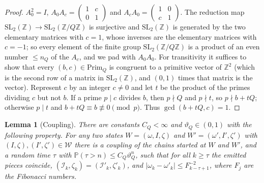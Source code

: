 \documentclass[11pt]{amsart}
\newtheorem{lemma}[theorem]{Lemma}
\theoremstyle{definition}
\numberwithin{equation}{section}
\newcommand{\Z}{\mathbb{Z}}
\newcommand{\Prob}{\mathbb{P}}
\newcommand{\cI}{\mathcal{I}}
\newcommand{\cW}{\mathcal{W}}
\newcommand{\Prim}{\mathrm{Prim}}
\begin{document}
\begin{proof}
$A_0^2=I$, $A_0A_c=\left(\begin{smallmatrix}1&c\\0&1\end{smallmatrix}\right)$ and $A_cA_0=\left(\begin{smallmatrix}1&0\\c&1\end{smallmatrix}\right)$. The reduction map
$\mathrm{SL}_2(\Z)\to\mathrm{SL}_2(\Z/Q\Z)$ is surjective and $\mathrm{SL}_2(\Z)$ is generated by the two elementary matrices with $c=1$, whose inverses
are the elementary matrices with $c=-1$; so every element of the finite group $\mathrm{SL}_2(\Z/Q\Z)$ is a product of an even number $\le n_Q$ of the
$A_c$, and we pad with $A_0A_0$. For transitivity it suffices to show that every $(b,c)\in\Prim_Q$ is congruent to a primitive vector of $\Z^2$
(which is the second row of a matrix in $\mathrm{SL}_2(\Z)$, and $(0,1)$ times that matrix is the vector). Represent $c$ by an integer $c\ne0$ and let
$t$ be the product of the primes dividing $c$ but not $b$. If a prime $p\mid c$ divides $b$, then $p\nmid Q$ and $p\nmid t$, so $p\nmid b+tQ$; otherwise
$p\mid t$ and $b+tQ\equiv b\not\equiv0\pmod p$. Thus $\gcd(b+tQ,c)=1$.
\end{proof}

\begin{lemma}[Coupling]\label{lem:coupling}
There are constants $C_Q<\infty$ and $\vartheta_Q\in(0,1)$ with the following property. For any two states $W=(\omega,I,\zeta)$ and
$W'=(\omega',I',\zeta')$ with $(I,\zeta),(I',\zeta')\in\cW$ there is a coupling of the chains started at $W$ and $W'$, and a random time $\tau$ with
$\Prob(\tau>n)\le C_Q\vartheta_Q^n$, such that for all $k\ge\tau$ the emitted pieces coincide, $(\cI_k,\zeta_k)=(\cI'_k,\zeta'_k)$, and
$|\omega_k-\omega'_k|\le F_{k-\tau+1}^{-2}$, where $F_j$ are the Fibonacci numbers.
\end{lemma}
\end{document}
